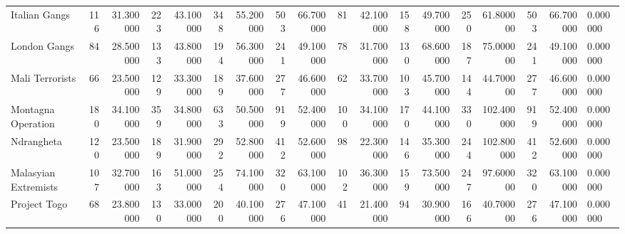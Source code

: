 \begin{tabular}{lrrrrrrrrrrrrrrrrl}
Italian Gangs & 116 & 31.300000 & 223 & 43.100000 & 348 & 55.200000 & 503 & 66.700000 & 81 & 42.100000 & 158 & 49.700000 & 250 & 61.800000 & 503 & 66.700000 & 0.000000 \\
London Gangs & 84 & 28.500000 & 133 & 43.800000 & 194 & 56.300000 & 241 & 49.100000 & 78 & 31.700000 & 130 & 68.600000 & 187 & 75.000000 & 241 & 49.100000 & 0.000000 \\
Mali Terrorists & 66 & 23.500000 & 129 & 33.300000 & 189 & 37.600000 & 277 & 46.600000 & 62 & 33.700000 & 103 & 45.700000 & 144 & 44.700000 & 277 & 46.600000 & 0.000000 \\
Montagna Operation & 180 & 34.100000 & 359 & 34.800000 & 633 & 50.500000 & 919 & 52.400000 & 100 & 34.100000 & 170 & 44.100000 & 330 & 102.400000 & 919 & 52.400000 & 0.000000 \\
Ndrangheta & 120 & 23.500000 & 189 & 31.900000 & 292 & 52.800000 & 412 & 52.600000 & 98 & 22.300000 & 146 & 35.300000 & 244 & 102.800000 & 412 & 52.600000 & 0.000000 \\
Malasyian Extremists & 107 & 32.700000 & 163 & 51.000000 & 254 & 74.100000 & 320 & 63.100000 & 102 & 36.300000 & 159 & 73.500000 & 247 & 97.600000 & 320 & 63.100000 & 0.000000 \\
Project Togo & 68 & 23.800000 & 130 & 33.000000 & 200 & 40.100000 & 276 & 47.100000 & 41 & 21.400000 & 94 & 30.900000 & 166 & 40.700000 & 276 & 47.100000 & 0.000000 \\
\end{tabular}
